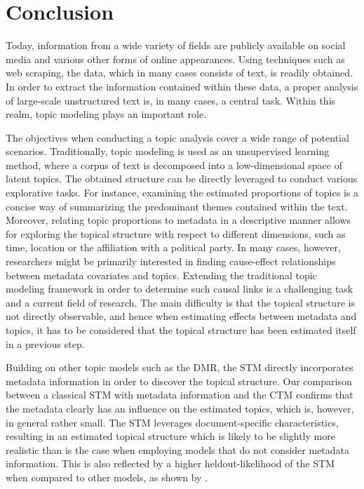\section{Conclusion}

Today, information from a wide variety of fields are publicly available on social media and various other forms of online appearances. Using techniques such as web scraping, the data, which in many cases consists of text, is readily obtained. In order to extract the information contained within these data, a proper analysis of large-scale unstructured text is, in many cases, a central task. Within this realm, topic modeling plays an important role.

The objectives when conducting a topic analysis cover a wide range of potential scenarios. Traditionally, topic modeling is used as an unsupervised learning method, where a corpus of text is decomposed into a low-dimensional space of latent topics. The obtained structure can be directly leveraged to conduct various explorative tasks. For instance, examining the estimated proportions of topics is a concise way of summarizing the predominant themes contained within the text. Moreover, relating topic proportions to metadata in a descriptive manner allows for exploring the topical structure with respect to different dimensions, such as time, location or the affiliation with a political party. In many cases, however, researchers might be primarily interested in finding cause-effect relationships between metadata covariates and topics. Extending the traditional topic modeling framework in order to determine such causal links is a challenging task and a current field of research. The main difficulty is that the topical structure is not directly observable, and hence when estimating effects between metadata and topics, it has to be considered that the topical structure has been estimated itself in a previous step.

Building on other topic models such as the DMR, the STM directly incorporates metadata information in order to discover the topical structure. Our comparison between a classical STM with metadata information and the CTM confirms that the metadata clearly has an influence on the estimated topics, which is, however, in general rather small. The STM leverages document-specific characteristics, resulting in an estimated topical structure which is likely to be slightly more realistic than is the case when employing models that do not consider metadata information. This is also reflected by a higher heldout-likelihood of the STM when compared to other models, as shown by \cite{roberts2016model}.

